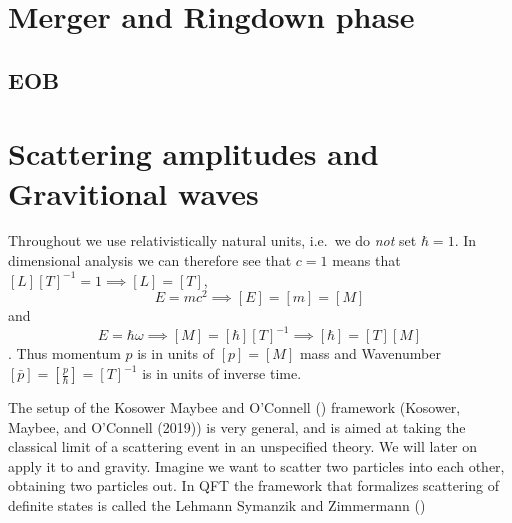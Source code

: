 \documentclass[
  letterpaper,
  DIV=11,
  numbers=noendperiod,
  oneside]{scrreprt}
\begin{document}

\hypertarget{merger-and-ringdown-phase}{%
\chapter{Merger and Ringdown phase}\label{merger-and-ringdown-phase}}

\hypertarget{section-5}{%
\section{\texorpdfstring{{EOB}}{EOB}}\label{section-5}}


\hypertarget{scattering-amplitudes-and-gravitional-waves}{%
\chapter{Scattering amplitudes and Gravitional
waves}\label{scattering-amplitudes-and-gravitional-waves}}

Throughout we use relativistically natural units, i.e.~we do \emph{not}
set \(\hbar=1\). In dimensional analysis we can therefore see that
\(c=1\) means that \([L][T]^{-1}=1 \implies [L]=[T]\),
\[E=mc^2\implies[E]=[m]=[M]\] and
\[E=\hbar \omega\implies [M]=[\hbar][T]^{-1}\implies [\hbar]=[T][M]\].
Thus momentum \(p\) is in units of \([p]=[M]\) mass and Wavenumber
\([\bar{p}]=[\frac{p}{\hbar}]=[T]^{-1}\) is in units of inverse time.

The setup of the Kosower Maybee and O'Connell () framework (Kosower,
Maybee, and O'Connell
(2019))
is very general, and is aimed at taking the classical limit of a
scattering event in an unspecified theory. We will later on apply it to
 and gravity. Imagine we want to scatter two particles into
each other, obtaining two particles out. In {QFT} the framework that
formalizes scattering of definite states is called the
Lehmann Symanzik and Zimmermann ()
\end{document}
